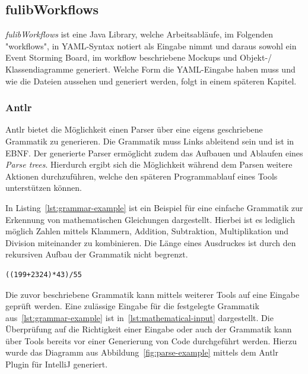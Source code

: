 \subsection{fulibWorkflows}\label{subsec:fulibworkflows}
\textit{fulibWorkflows} ist eine Java Library, welche Arbeitsabläufe, im Folgenden "workflows", in \ac{YAML}-Syntax notiert als Eingabe nimmt und daraus
sowohl ein Event Storming Board, im workflow beschriebene Mockups und Objekt-/ Klassendiagramme generiert.
Welche Form die YAML-Eingabe haben muss und wie die Dateien aussehen und generiert werden, folgt in einem späteren Kapitel.

\subsubsection{Antlr}\label{subsubsec:antlr}
Antlr bietet die Möglichkeit einen Parser über eine eigens geschriebene Grammatik zu generieren.
Die Grammatik muss Links ableitend sein und ist in \ac{EBNF}.
Der generierte Parser ermöglicht zudem das Aufbauen und Ablaufen eines \textit{Parse trees}.
Hierdurch ergibt sich die Möglichkeit während dem Parsen weitere Aktionen durchzuführen, welche den späteren Programmablauf eines Tools unterstützen können.



In Listing~\ref{lst:grammar-example} ist ein Beispiel für eine einfache Grammatik zur Erkennung von mathematischen Gleichungen dargestellt.\cite{antlrOrg}
Hierbei ist es lediglich möglich Zahlen mittels Klammern, Addition, Subtraktion, Multiplikation und Division miteinander zu kombinieren.
Die Länge eines Ausdruckes ist durch den rekursiven Aufbau der Grammatik nicht begrenzt.

\begin{lstlisting}[caption={Einfacher mathematischer Ausdruck},label={lst:mathematical-input}]
    ((199+2324)*43)/55

\end{lstlisting}

Die zuvor beschriebene Grammatik kann mittels weiterer Tools auf eine Eingabe geprüft werden.
Eine zulässige Eingabe für die festgelegte Grammatik aus~\ref{lst:grammar-example} ist in~\ref{lst:mathematical-input} dargestellt.
Die Überprüfung auf die Richtigkeit einer Eingabe oder auch der Grammatik kann über Tools bereits vor einer Generierung von Code durchgeführt werden.
Hierzu wurde das Diagramm aus Abbildung~\ref{fig:parse-example} mittels dem Antlr Plugin für IntelliJ generiert.

